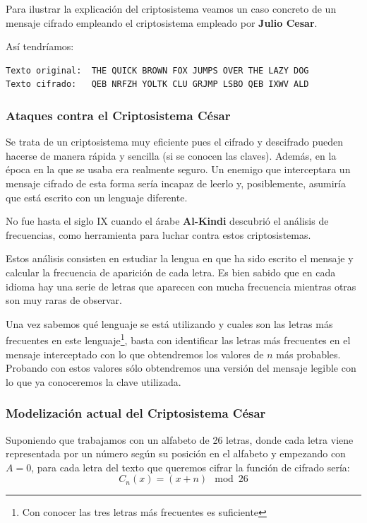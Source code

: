 \documentclass[nochap]{apuntesURJC}
\begin{document}
Para ilustrar la explicación del criptosistema veamos un caso concreto de un mensaje cifrado empleando el criptosistema empleado por \textbf{Julio Cesar}.

Así tendríamos:
\begin{verbatim}
Texto original:  THE QUICK BROWN FOX JUMPS OVER THE LAZY DOG
Texto cifrado:   QEB NRFZH YOLTK CLU GRJMP LSBO QEB IXWV ALD
\end{verbatim}

\subsubsection{Ataques contra el Criptosistema César}
Se trata de un criptosistema muy eficiente pues el cifrado y descifrado pueden hacerse de manera rápida y sencilla (si se conocen las claves). Además, en la época en la que se usaba era realmente seguro. Un enemigo que interceptara un mensaje cifrado de esta forma sería incapaz de leerlo y, posiblemente, asumiría que está escrito con un lenguaje diferente.

No fue hasta el siglo IX cuando el árabe \textbf{Al-Kindi} descubrió el análisis de frecuencias, como herramienta para luchar contra estos criptosistemas.

Estos análisis consisten en estudiar la lengua en que ha sido escrito el mensaje y calcular la frecuencia de aparición de cada letra. Es bien sabido que en cada idioma hay una serie de letras que aparecen con mucha frecuencia mientras otras son muy raras de observar.

Una vez sabemos qué lenguaje se está utilizando y cuales son las letras más frecuentes en este lenguaje\footnote{Con conocer las tres letras más frecuentes es suficiente}, basta con identificar las letras más frecuentes en el mensaje interceptado con lo que obtendremos los valores de $n$ más probables. Probando con estos valores sólo obtendremos una versión del mensaje legible con lo que ya conoceremos la clave utilizada.

\subsubsection{Modelización actual del Criptosistema César}

Suponiendo que trabajamos con un alfabeto de 26 letras, donde cada letra viene representada por un número según su posición en el alfabeto y empezando con $A=0$, para cada letra del texto que queremos cifrar la función de cifrado sería:
\[C_n(x)=(x+n) \mod 26\]
\end{document}
